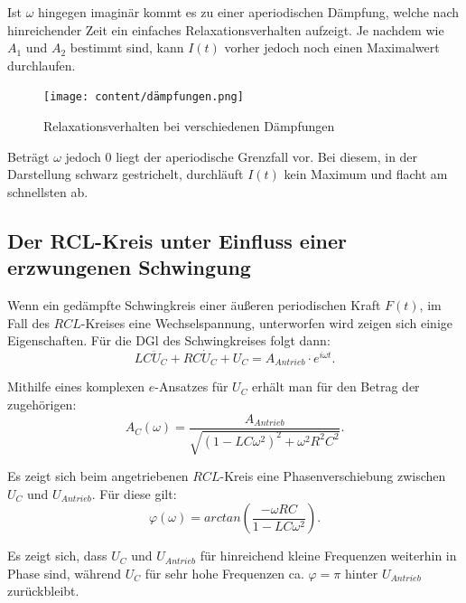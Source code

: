 Ist $\omega$ hingegen imaginär kommt es zu einer
aperiodischen Dämpfung, welche nach hinreichender Zeit  ein einfaches Relaxationsverhalten
 aufzeigt. Je nachdem wie $A_1$ und $A_2$ bestimmt sind, kann $I(t)$ vorher jedoch noch einen
 Maximalwert durchlaufen.
 \begin{figure}[H]
   \centering
   \texttt{[image: content/dämpfungen.png]}
   \caption{Relaxationsverhalten bei verschiedenen Dämpfungen}
   \label{fig:Dämpfungen}
 \end{figure}
 Beträgt $\omega$ jedoch 0 liegt der aperiodische Grenzfall vor. Bei diesem, in der Darstellung schwarz gestrichelt,
  durchläuft $I(t)$ kein Maximum und flacht am schnellsten ab.

\subsection{ Der RCL-Kreis unter Einfluss einer erzwungenen Schwingung}

Wenn ein gedämpfte Schwingkreis einer äußeren periodischen Kraft $F(t)$, im Fall des $RCL$-Kreises
 eine Wechselspannung, unterworfen wird zeigen sich einige Eigenschaften.
Für die DGl des Schwingkreises folgt dann:
\begin{equation}
  LC \ddot{U}_C + RC \dot{U}_C + U_C = A_{Antrieb} \cdot e^{i\omega t}\text{.}
\end{equation}

Mithilfe eines komplexen $e$-Ansatzes für $U_C$ erhält man für den Betrag der zugehörigen:
\begin{equation}
  A_C(\omega) = \frac{A_{Antrieb}}{\sqrt{(1-LC\omega^2)^2 + \omega^2R^2C^2}}\text{.}
\end{equation}

Es zeigt sich beim angetriebenen $RCL$-Kreis eine Phasenverschiebung zwischen $U_C$ und $U_{Antrieb}$.
Für diese gilt:
\begin{equation}
  \varphi(\omega) = arctan\left( \frac{-\omega RC}{1-LC \omega^2}\right)\text{.}
\end{equation}

Es zeigt sich, dass $U_C$ und $U_{Antrieb}$ für hinreichend kleine Frequenzen weiterhin in Phase sind,
während $U_C$ für sehr hohe Frequenzen ca. $\varphi = \pi$ hinter $U_{Antrieb}$ zurückbleibt.



